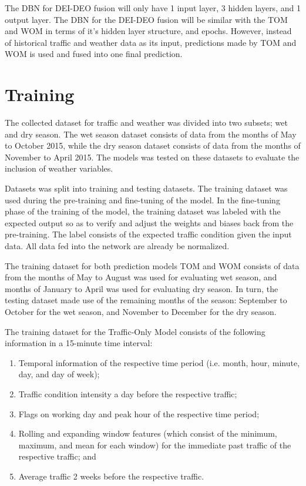 The DBN for DEI-DEO fusion will only have 1 input layer, 3 hidden layers, and 1 output layer. The DBN for the DEI-DEO fusion will be similar with the TOM and WOM in terms of it’s hidden layer structure, and epochs. However, instead of historical traffic and weather data as its input, predictions made by TOM and WOM is used and fused into one final prediction.

\section{Training}
The collected dataset for traffic and weather was divided into two subsets; wet and dry season. The wet season dataset consists of data from the months of May to October 2015, while the dry season dataset consists of data from the months of November to April 2015. The models was tested on these datasets to evaluate the inclusion of weather variables.

Datasets was split into training and testing datasets. The training dataset was used during the pre-training and fine-tuning of the model. In the fine-tuning phase of the training of the model, the training dataset was labeled with the expected output so as to verify and adjust the weights and biases back from the pre-training. The label consists of the expected traffic condition given the input data. All data fed into the network are already be normalized.

The training dataset for both prediction models TOM and WOM consists of data from the months of May to August was used for evaluating wet season, and months of January to April was used for evaluating dry season. In turn, the testing dataset made use of the remaining months of the season: September to October for the wet season, and November to December for the dry season.

The training dataset for the Traffic-Only Model consists of the following information in a 15-minute time interval:

\begin{enumerate}
\item Temporal information of the respective time period (i.e. month, hour, minute, day, and day of week);
\item Traffic condition intensity a day before the respective traffic;
\item Flags on working day and peak hour of the respective time period;
\item Rolling and expanding window features (which consist of the minimum, maximum, and mean for each window) for the immediate past traffic of the respective traffic; and
\item Average traffic 2 weeks before the respective traffic.
\end{enumerate}

